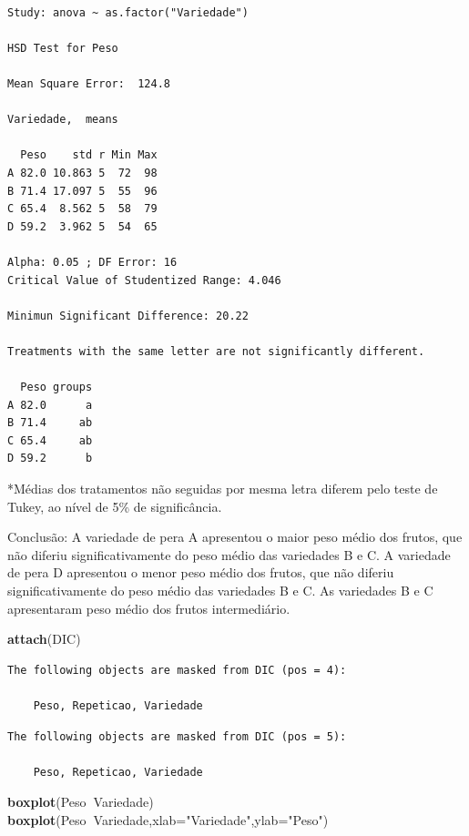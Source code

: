 \documentclass[12pt,brazil,oneside]{book}
\newenvironment{Shaded}{\begin{snugshade}}{\end{snugshade}}
\newcommand{\DataTypeTok}[1]{\textcolor[rgb]{0.13,0.29,0.53}{#1}}
\newcommand{\KeywordTok}[1]{\textcolor[rgb]{0.13,0.29,0.53}{\textbf{#1}}}
\newcommand{\NormalTok}[1]{#1}
\newcommand{\OperatorTok}[1]{\textcolor[rgb]{0.81,0.36,0.00}{\textbf{#1}}}
\newcommand{\StringTok}[1]{\textcolor[rgb]{0.31,0.60,0.02}{#1}}
\begin{document}
\begin{verbatim}

Study: anova ~ as.factor("Variedade")

HSD Test for Peso 

Mean Square Error:  124.8 

Variedade,  means

  Peso    std r Min Max
A 82.0 10.863 5  72  98
B 71.4 17.097 5  55  96
C 65.4  8.562 5  58  79
D 59.2  3.962 5  54  65

Alpha: 0.05 ; DF Error: 16 
Critical Value of Studentized Range: 4.046 

Minimun Significant Difference: 20.22 

Treatments with the same letter are not significantly different.

  Peso groups
A 82.0      a
B 71.4     ab
C 65.4     ab
D 59.2      b
\end{verbatim}

*Médias dos tratamentos não seguidas por mesma letra diferem pelo teste
de Tukey, ao nível de 5\% de significância.

Conclusão: A variedade de pera A apresentou o maior peso médio dos
frutos, que não diferiu significativamente do peso médio das variedades
B e C. A variedade de pera D apresentou o menor peso médio dos frutos,
que não diferiu significativamente do peso médio das variedades B e C.
As variedades B e C apresentaram peso médio dos frutos intermediário.

\begin{Shaded}
\begin{Highlighting}[]
\KeywordTok{attach}\NormalTok{(DIC)}
\end{Highlighting}
\end{Shaded}

\begin{verbatim}
The following objects are masked from DIC (pos = 4):

    Peso, Repeticao, Variedade
\end{verbatim}

\begin{verbatim}
The following objects are masked from DIC (pos = 5):

    Peso, Repeticao, Variedade
\end{verbatim}

\begin{Shaded}
\begin{Highlighting}[]
\KeywordTok{boxplot}\NormalTok{(Peso}\OperatorTok{~}\NormalTok{Variedade)}
\KeywordTok{boxplot}\NormalTok{(Peso}\OperatorTok{~}\NormalTok{Variedade,}\DataTypeTok{xlab=}\StringTok{"Variedade"}\NormalTok{,}\DataTypeTok{ylab=}\StringTok{"Peso"}\NormalTok{)}
\end{Highlighting}
\end{Shaded}
\end{document}
